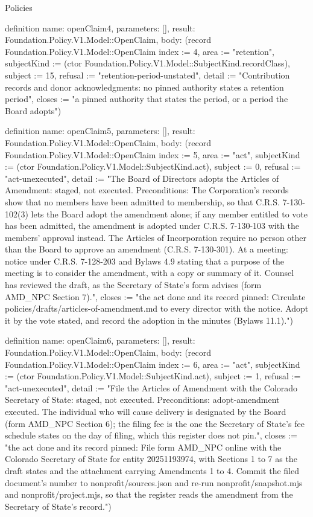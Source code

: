 \begin{lexlean}{Policies}
\begin{semanticmodule}
definition{
  name: openClaim4,
  parameters: [],
  result: Foundation.Policy.V1.Model::OpenClaim,
  body: (record Foundation.Policy.V1.Model::OpenClaim {index := 4, area := "retention", subjectKind := (ctor Foundation.Policy.V1.Model::SubjectKind.recordClass), subject := 15, refusal := "retention-period-unstated", detail := "Contribution records and donor acknowledgments: no pinned authority states a retention period", closes := "a pinned authority that states the period, or a period the Board adopts"})
}

definition{
  name: openClaim5,
  parameters: [],
  result: Foundation.Policy.V1.Model::OpenClaim,
  body: (record Foundation.Policy.V1.Model::OpenClaim {index := 5, area := "act", subjectKind := (ctor Foundation.Policy.V1.Model::SubjectKind.act), subject := 0, refusal := "act-unexecuted", detail := "The Board of Directors adopts the Articles of Amendment: staged, not executed. Preconditions: The Corporation's records show that no members have been admitted to membership, so that C.R.S. 7-130-102(3) lets the Board adopt the amendment alone; if any member entitled to vote has been admitted, the amendment is adopted under C.R.S. 7-130-103 with the members' approval instead. The Articles of Incorporation require no person other than the Board to approve an amendment (C.R.S. 7-130-301). At a meeting: notice under C.R.S. 7-128-203 and Bylaws 4.9 stating that a purpose of the meeting is to consider the amendment, with a copy or summary of it. Counsel has reviewed the draft, as the Secretary of State's form advises (form AMD_NPC Section 7).", closes := "the act done and its record pinned: Circulate policies/drafts/articles-of-amendment.md to every director with the notice. Adopt it by the vote stated, and record the adoption in the minutes (Bylaws 11.1)."})
}

definition{
  name: openClaim6,
  parameters: [],
  result: Foundation.Policy.V1.Model::OpenClaim,
  body: (record Foundation.Policy.V1.Model::OpenClaim {index := 6, area := "act", subjectKind := (ctor Foundation.Policy.V1.Model::SubjectKind.act), subject := 1, refusal := "act-unexecuted", detail := "File the Articles of Amendment with the Colorado Secretary of State: staged, not executed. Preconditions: adopt-amendment executed. The individual who will cause delivery is designated by the Board (form AMD_NPC Section 6); the filing fee is the one the Secretary of State's fee schedule states on the day of filing, which this register does not pin.", closes := "the act done and its record pinned: File form AMD_NPC online with the Colorado Secretary of State for entity 20251193974, with Sections 1 to 7 as the draft states and the attachment carrying Amendments 1 to 4. Commit the filed document's number to nonprofit/sources.json and re-run nonprofit/snapshot.mjs and nonprofit/project.mjs, so that the register reads the amendment from the Secretary of State's record."})
}


\end{semanticmodule}
\end{lexlean}
